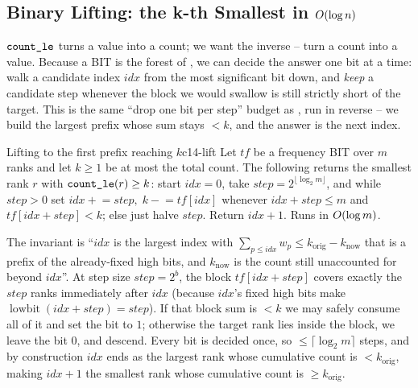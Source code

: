 \subsection{Binary Lifting: the k-th Smallest in \texorpdfstring{\(O(\log n)\)}{O(log n)}}

\(\texttt{count\_le}\) turns a value into a count; we want the inverse -- turn
a count into a value.  Because a BIT is the forest of ,
we can decide the answer one bit at a time: walk a candidate index
\(\mathit{idx}\) from the most significant bit down, and \emph{keep} a
candidate step whenever the block we would swallow is still strictly short of
the target.  This is the same ``drop one bit per step'' budget as
, run in reverse -- we build the largest prefix whose sum
stays \(<k\), and the answer is the next index.

\begin{theorem}{Lifting to the first prefix reaching \(k\)}{c14-lift}
Let \(\mathit{tf}\) be a frequency BIT over \(m\) ranks and let \(k\ge1\) be
at most the total count.  The following returns the smallest rank
\(r\) with \(\texttt{count\_le}(r)\ge k\): start \(\mathit{idx}=0\), take
\(\mathit{step}=2^{\lfloor\log_2 m\rfloor}\), and while \(\mathit{step}>0\)
set \(\mathit{idx}\mathrel{+}=\mathit{step},\;k\mathrel{-}=\mathit{tf}[\mathit{idx}]\)
whenever \(\mathit{idx}{+}\mathit{step}\le m\) and \(\mathit{tf}[\mathit{idx}{+}\mathit{step}]<k\);
else just halve \(\mathit{step}\).  Return \(\mathit{idx}+1\).  Runs in
\(O(\log m)\).
\end{theorem}
\begin{proofbox}
The invariant is ``\(\mathit{idx}\) is the largest index with
\(\sum_{p\le \mathit{idx}} w_p \le k_{\text{orig}} - k_{\text{now}}\) that is
a prefix of the already-fixed high bits, and \(k_{\text{now}}\) is the count
still unaccounted for beyond \(\mathit{idx}\)''.  At step size
\(\mathit{step}=2^{b}\), the block \(\mathit{tf}[\mathit{idx}{+}\mathit{step}]\)
covers exactly the \(\mathit{step}\) ranks immediately after \(\mathit{idx}\)
(because \(\mathit{idx}\)'s fixed high bits make
\(\operatorname{lowbit}(\mathit{idx}{+}\mathit{step})=\mathit{step}\)).  If
that block sum is \(<k\) we may safely consume all of it and set the bit to
\(1\); otherwise the target rank lies inside the block, we leave the bit
\(0\), and descend.  Every bit is decided once, so \(\le\lceil\log_2
m\rceil\) steps, and by construction \(\mathit{idx}\) ends as the largest
rank whose cumulative count is \(<k_{\text{orig}}\), making \(\mathit{idx}+1\)
the smallest rank whose cumulative count is \(\ge k_{\text{orig}}\).
\end{proofbox}

